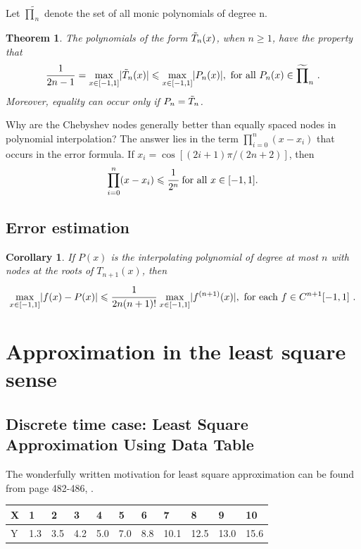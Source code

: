 \documentclass[12pt]{article}
\newtheorem{thm}{Theorem}
\theoremstyle{theorem}
\newtheorem{cor}{Corollary}
\begin{document}
Let $\widetilde{\prod}_n$ denote the set of all monic polynomials of degree n.
\begin{thm}
The polynomials of the form $\tT_n(x)$, when $n \geq 1$, have the property that
\[ \frac{1}{2n-1} = \underset{x \in [-1,1]}{\max}|\tT_n(x)| \leq  \underset{x \in [-1,1]}{\max} |P_n(x)|, \mbox{ for all } P_n(x) \in \widetilde{\prod}_n \ .
 \]
Moreover, equality can occur only if $P_n = \tT_n$.
\end{thm}

Why are the Chebyshev nodes generally better than equally spaced nodes in polynomial interpolation? The answer lies in the term $\prod_{i=0}^{n}(x-x_i)$ that occurs in the error formula. \linebreak If $x_i = \cos[(2i + 1)\pi/(2n + 2)]$, then
%
\begin{equation*}
 \prod_{i=0}^{n}(x-x_i) \leq \cfrac{1}{2^n} \mbox{ for all } x\in [-1,1].
\end{equation*}
% 

\subsection{Error estimation}

\begin{shaded}
\begin{cor}
If $P(x)$ is the interpolating polynomial of degree at most $n$ with nodes at the roots of $T_{n+1}(x)$, then
%
\[  \underset{x \in [-1,1]}{\max} |f(x)-P(x)| \leq \cfrac{1}{2n(n + 1)!} \ \underset{x \in [-1,1]}{\max} | f^{(n+1)}(x)|, \mbox{ for each } f \in C^{n+1}[-1,1] \ . \]%
\end{cor}
\end{shaded}

\cleardoublepage 

\section{Approximation in the least square sense}

\subsection{Discrete time case: Least Square Approximation Using Data Table}

The wonderfully written motivation for least square approximation can be found from page 482-486, \cite{BurF10}.
\begin{center}
\begin{tabular}[12]{l|l|l|l|l|l|l|l|l|l|l}
X & 1 & 2 & 3 & 4 & 5 & 6 & 7 & 8 & 9 & 10 \\ \hline 	
Y & 1.3 & 3.5 & 4.2 & 5.0 & 7.0 & 8.8 & 10.1 & 12.5 & 13.0 & 15.6
\end{tabular}	
\end{center}
\end{document}
